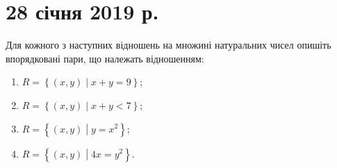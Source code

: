 \section*{28 січня 2019 р.}

\begin{problem}
	Для кожного з наступних відношень на множині натуральних чисел опишіть впорядковані пари, що належать відношенням:
	\begin{enumerate}
		\item $R = \left\{ \left( x, y \right) \middle| x + y = 9 \right\}$;
		\item $R = \left\{ \left( x, y \right) \middle| x + y < 7 \right\}$;
		\item $R = \left\{ \left( x, y \right) \middle| y = x^2 \right\}$;
		\item $R = \left\{ \left( x, y \right) \middle| 4 x = y^2 \right\}$.
	\end{enumerate}
\end{problem}

